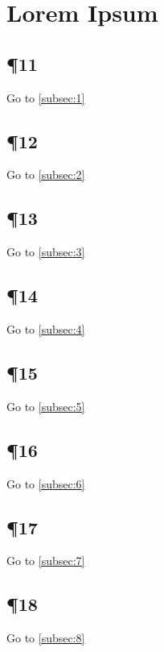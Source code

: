 \documentclass{article}
\begin{document}
\section{Lorem Ipsum}
\subsection{\P 11}\label{subsec:11}\lipsum[11] Go to \ref{subsec:1}
\subsection{\P 12}\label{subsec:12}\lipsum[12] Go to \ref{subsec:2}
\subsection{\P 13}\label{subsec:13}\lipsum[13] Go to \ref{subsec:3}
\subsection{\P 14}\label{subsec:14}\lipsum[14] Go to \ref{subsec:4}
\subsection{\P 15}\label{subsec:15}\lipsum[15] Go to \ref{subsec:5}
\subsection{\P 16}\label{subsec:16}\lipsum[16] Go to \ref{subsec:6}
\subsection{\P 17}\label{subsec:17}\lipsum[17] Go to \ref{subsec:7}
\subsection{\P 18}\label{subsec:18}\lipsum[18] Go to \ref{subsec:8}
\end{document}
